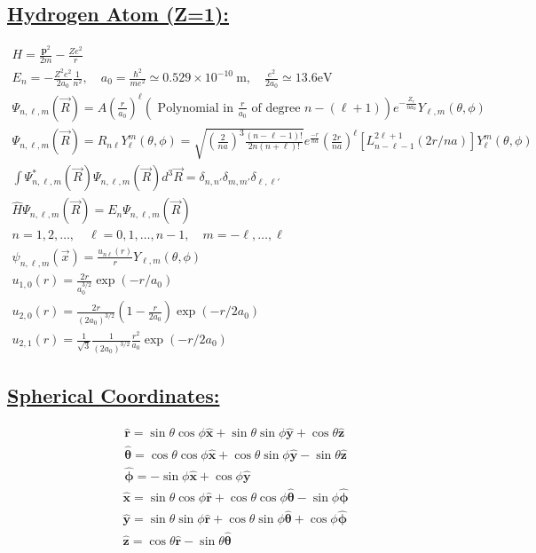 \documentclass[a4paper,12pt]{article}
\begin{document}
\subsection*{\underline{Hydrogen Atom (Z=1):}}
\begin{gather}
    H=\frac{\mathbf{p}^{2}}{2 m}-\frac{Z e^{2}}{r} \\
    E_{n}=-\frac{Z^{2} e^{2}}{2 a_{0}} \frac{1}{n^{2}}, \quad a_{0}=\frac{\hbar^{2}}{m e^{2}} \simeq 0.529 \times 10^{-10} \mathrm{~m}, \quad \frac{e^{2}}{2 a_{0}} \simeq 13.6 \mathrm{eV} \\
    \Psi_{n, \ell, m}(\vec{R})=A\left(\frac{r}{a_{0}}\right)^{\ell}\left(\text { Polynomial in } \frac{r}{a_{0}} \text { of degree } n-(\ell+1)\right) e^{-\frac{Z_{r}}{n a_{0}}} Y_{\ell, m}(\theta, \phi) \\
    \Psi_{n, \ell, m}(\vec{R}) = R_{n \ell}{Y_{\ell}^m}(\theta, \phi)= \sqrt{(\frac{2}{na})^3\frac{\left(n-\ell-1\right)!}{2n(n+\ell)!}}e^{\frac{-r}{na}}(\frac{2r}{na})^\ell [L_{n-\ell-1}^{2\ell+1}(2r/na)]{Y_{\ell}^m}(\theta, \phi)\\
    \int\Psi^*_{n, \ell, m}(\vec{R})\Psi_{n, \ell, m}(\vec{R})d^3\vec R=\delta_{n,n'}\delta_{m,m'}\delta_{\ell,\ell '}\\
    \hat{H}\Psi_{n, \ell, m}(\vec{R}) = E_n\Psi_{n, \ell, m}(\vec{R})\\
    n=1,2, \ldots, \quad \ell=0,1, \ldots, n-1, \quad m=-\ell, \ldots, \ell \\
    \psi_{n, \ell, m}(\vec{x})=\frac{u_{n \ell}(r)}{r} Y_{\ell, m}(\theta, \phi) \\
    u_{1,0}(r)=\frac{2 r}{a_{0}^{3 / 2}} \exp \left(-r / a_{0}\right) \\
    u_{2,0}(r)=\frac{2 r}{\left(2 a_{0}\right)^{3 / 2}}\left(1-\frac{r}{2 a_{0}}\right) \exp \left(-r / 2 a_{0}\right) \\
    u_{2,1}(r)=\frac{1}{\sqrt{3}} \frac{1}{\left(2 a_{0}\right)^{3 / 2}} \frac{r^{2}}{a_{0}} \exp \left(-r / 2 a_{0}\right)
\end{gather}
\subsection*{\underline{Spherical Coordinates:}}
$$
\begin{aligned}
&\hat{\mathbf{r}}=\sin \theta \cos \phi \hat{\mathbf{x}}+\sin \theta \sin \phi \hat{\mathbf{y}}+\cos \theta \hat{\mathbf{z}} \\
&\hat{\boldsymbol{\theta}}=\cos \theta \cos \phi \hat{\mathbf{x}}+\cos \theta \sin \phi \hat{\mathbf{y}}-\sin \theta \hat{\mathbf{z}} \\
&\hat{\boldsymbol{\phi}}=-\sin \phi \hat{\mathbf{x}}+\cos \phi \hat{\mathbf{y}}
\end{aligned}
$$
$$
\begin{aligned}
&\hat{\mathbf{x}}=\sin \theta \cos \phi \hat{\mathbf{r}}+\cos \theta \cos \phi \hat{\boldsymbol{\theta}}-\sin \phi \hat{\boldsymbol{\phi}} \\
&\hat{\mathbf{y}}=\sin \theta \sin \phi \hat{\mathbf{r}}+\cos \theta \sin \phi \hat{\boldsymbol{\theta}}+\cos \phi \hat{\boldsymbol{\phi}} \\
&\hat{\mathbf{z}}=\cos \theta \hat{\mathbf{r}}-\sin \theta \hat{\boldsymbol{\theta}}
\end{aligned}
$$
\end{document}
